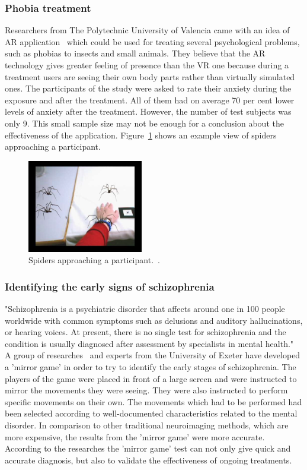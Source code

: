 \documentclass[12pt]{article}
\begin{document}
\subsubsection{Phobia treatment} \label{sec:Phobia treatment}
Researchers from The Polytechnic University of Valencia came with an idea of \ac{AR} application~\cite{phobia} which could be used for treating several psychological problems, such as phobias to insects and small animals. They believe that the \ac{AR} technology gives greater feeling of presence than the \ac{VR} one because during a treatment users are seeing their own body parts rather than virtually simulated ones. The participants of the study were asked to rate their anxiety during the exposure and after the treatment. All of them had on average 70 per cent lower levels of anxiety after the treatment. However, the number of test subjects was only 9. This small sample size may not be enough for a conclusion about the effectiveness of the application. Figure~\ref{fig:phobia} shows an example view of spiders approaching a participant.

\begin{figure} [ht]
    \centering
    \includegraphics[width=0.45\textwidth]{../images/phobia.png}
    \caption{Spiders approaching a participant.~\cite{phobia}.}
    \label{fig:phobia}
\end{figure}

\subsubsection{Identifying the early signs of schizophrenia} \label{sec:Identifying the early signs of schizophrenia}
"Schizophrenia is a psychiatric disorder that affects around one in 100 people worldwide with common symptoms such as delusions and auditory hallucinations, or hearing voices. At present, there is no single test for schizophrenia and the condition is usually diagnosed after assessment by specialists in mental health."~\cite{schizophrenia} A group of researches~\cite{schizophrenia} and experts from the University of Exeter have developed a 'mirror game' in order to try to identify the early stages of schizophrenia. The players of the game were placed in front of a large screen and were instructed to mirror the movements they were seeing. They were also instructed to perform specific movements on their own. The movements which had to be performed had been selected according to well-documented characteristics related to the mental disorder. In comparison to other traditional neuroimaging methods, which are more expensive, the results from the 'mirror game' were more accurate. According to the researches the 'mirror game' test can not only give quick and accurate diagnosis, but also to validate the effectiveness of ongoing treatments.
\end{document}
